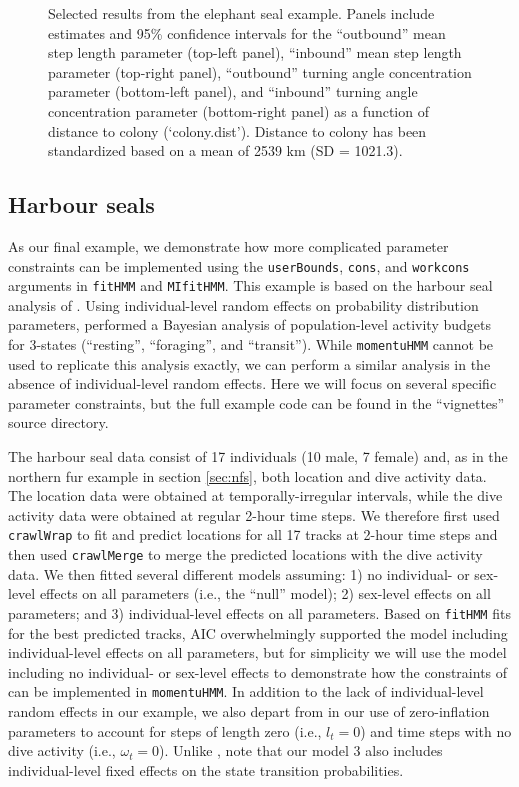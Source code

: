 \documentclass[12pt]{article}\usepackage[]{graphicx}\usepackage[]{color}
\begin{document}
\begin{figure}[htbp]
  \caption{Selected results from the elephant seal example. Panels include estimates and 95\% confidence intervals for the ``outbound'' mean step length parameter (top-left panel), ``inbound'' mean step length parameter (top-right panel), ``outbound'' turning angle concentration parameter (bottom-left panel), and ``inbound'' turning angle concentration parameter (bottom-right panel) as a function of distance to colony (`colony.dist'). Distance to colony has been standardized based on a mean of 2539 km (SD = 1021.3).}
  \label{fig:sesResults}
\end{figure}

\subsection{Harbour seals}
\label{sec:harbourSeal}
As our final example, we demonstrate how more complicated parameter constraints can be implemented using the \verb|userBounds|, \verb|cons|, and \verb|workcons| arguments in \verb|fitHMM| and \verb|MIfitHMM|. This example is based on the harbour seal analysis of \cite{McClintockEtAl2013c}. Using individual-level random effects on probability distribution parameters, \cite{McClintockEtAl2013c} performed a Bayesian analysis of population-level activity budgets for 3-states (``resting'', ``foraging'', and ``transit''). While \verb|momentuHMM| cannot be used to replicate this analysis exactly, we can perform a similar analysis in the absence of individual-level random effects. Here we will focus on several specific parameter constraints, but the full example code can be found in the ``vignettes'' source directory. 

The harbour seal data consist of 17 individuals (10 male, 7 female) and, as in the northern fur example in section \ref{sec:nfs}, both location and dive activity data. The location data were obtained at temporally-irregular intervals, while the dive activity data were obtained at regular 2-hour time steps. We therefore first used \verb|crawlWrap| to fit and predict locations for all 17 tracks at 2-hour time steps and then used \verb|crawlMerge| to merge the predicted locations with the dive activity data. We then fitted several different models assuming: 1) no individual- or sex-level effects on all parameters (i.e., the ``null'' model); 2) sex-level effects on all parameters; and 3) individual-level effects on all parameters.  Based on \verb|fitHMM| fits for the best predicted tracks, AIC overwhelmingly supported the model including individual-level effects on all parameters, but for simplicity we will use the model including no individual- or sex-level effects to demonstrate how the constraints of \cite{McClintockEtAl2013c} can be implemented in \verb|momentuHMM|.  In addition to the lack of individual-level random effects in our example, we also depart from \cite{McClintockEtAl2013c} in our use of zero-inflation parameters to account for steps of length zero (i.e., $l_t=0$) and time steps with no dive activity (i.e., $\omega_t=0$). Unlike \cite{McClintockEtAl2013c}, note that our model 3 also includes individual-level fixed effects on the state transition probabilities.
\end{document}
